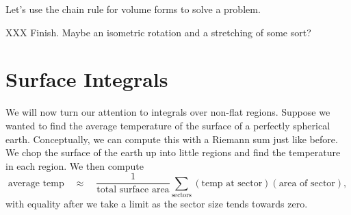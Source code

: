 %
%
Let's use the chain rule for volume forms to solve a problem.
\begin{example}
	XXX Finish.  Maybe an isometric rotation and a stretching of some sort?
\end{example}

\begin{exercises}
\end{exercises}

\section{Surface Integrals}
We will now turn our attention to integrals over non-flat regions.  Suppose
we wanted to find the average temperature of the surface of a perfectly
spherical earth.  Conceptually, we can compute this with a Riemann sum
just like before.  We chop the surface of the earth up into little regions
and find the temperature in each region.  We then compute
\[
	\text{average temp}\quad\approx\quad\frac{1}{\text{total surface area}} \sum_{\text{sectors}}
	(\text{temp at sector})(\text{area of sector}),
\]
with equality after we take a limit as the sector size tends towards zero.  

